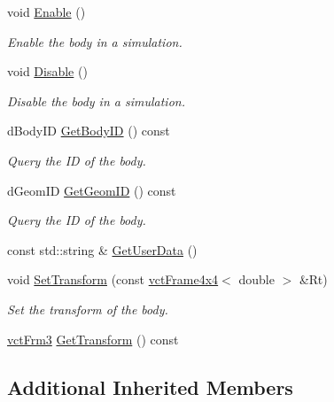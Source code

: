 \begin{DoxyCompactItemize}
void \hyperlink{classosa_o_d_e_body_ada9f6d67c4d6e4458db6db0ccb02c290}{Enable} ()
\begin{DoxyCompactList}\small\item\em Enable the body in a simulation. \end{DoxyCompactList}\item 
void \hyperlink{classosa_o_d_e_body_ab1a65c0f8bceb729273ae5f7f1d747a4}{Disable} ()
\begin{DoxyCompactList}\small\item\em Disable the body in a simulation. \end{DoxyCompactList}\item 
d\-Body\-I\-D \hyperlink{classosa_o_d_e_body_ac268b256773cf24b67c1db8213013d07}{Get\-Body\-I\-D} () const 
\begin{DoxyCompactList}\small\item\em Query the I\-D of the body. \end{DoxyCompactList}\item 
d\-Geom\-I\-D \hyperlink{classosa_o_d_e_body_ac17275bff032b8e6ba2de166dacdef0a}{Get\-Geom\-I\-D} () const 
\begin{DoxyCompactList}\small\item\em Query the I\-D of the body. \end{DoxyCompactList}\item 
const std\-::string \& \hyperlink{classosa_o_d_e_body_a44652743974777f38f508689b3e58873}{Get\-User\-Data} ()
\item 
void \hyperlink{classosa_o_d_e_body_a5b25e3f15c09f6bf7c937f791fbd9b43}{Set\-Transform} (const \hyperlink{classvct_frame4x4}{vct\-Frame4x4}$<$ double $>$ \&Rt)
\begin{DoxyCompactList}\small\item\em Set the transform of the body. \end{DoxyCompactList}\item 
\hyperlink{vct_transformation_types_8h_a81feda0a02c2d1bc26e5553f409fed20}{vct\-Frm3} \hyperlink{classosa_o_d_e_body_ae3f83f9ecdcd335e2f3a37e0a32167a1}{Get\-Transform} () const 
\end{DoxyCompactItemize}
\subsection*{Additional Inherited Members}


